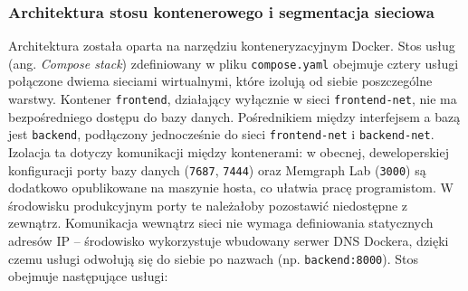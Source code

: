 \documentclass[twoside]{projektInzynierskiMS1z}
\begin{document}
\subsubsection{Architektura stosu kontenerowego i segmentacja sieciowa}

Architektura została oparta na narzędziu konteneryzacyjnym Docker. Stos usług
(ang. \emph{Compose stack}) zdefiniowany w pliku \texttt{compose.yaml} obejmuje
cztery usługi połączone dwiema sieciami wirtualnymi, które izolują od siebie
poszczególne warstwy. Kontener \texttt{frontend}, działający wyłącznie w sieci
\texttt{frontend-net}, nie ma bezpośredniego dostępu do bazy danych.
Pośrednikiem między interfejsem a bazą jest \texttt{backend}, podłączony
jednocześnie do sieci \texttt{frontend-net} i \texttt{backend-net}. Izolacja ta
dotyczy komunikacji między kontenerami: w obecnej, deweloperskiej konfiguracji
porty bazy danych (\texttt{7687}, \texttt{7444}) oraz Memgraph Lab
(\texttt{3000}) są dodatkowo opublikowane na maszynie hosta, co ułatwia pracę
programistom. W środowisku produkcyjnym porty te należałoby pozostawić
niedostępne z zewnątrz. Komunikacja wewnątrz sieci nie wymaga definiowania
statycznych adresów IP -- środowisko wykorzystuje wbudowany serwer DNS Dockera,
dzięki czemu usługi odwołują się do siebie po nazwach (np.
\texttt{backend:8000}). Stos obejmuje następujące usługi:
\end{document}
